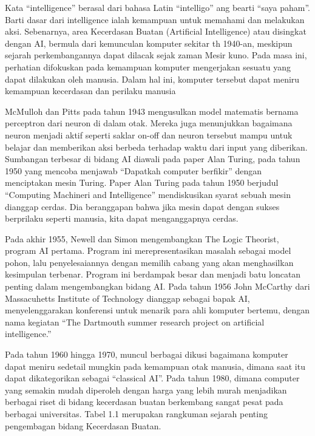 \hspace{1cm} Kata “intelligence” berasal dari bahasa Latin “intelligo” ang bearti “saya paham”.  Barti dasar dari intelligence ialah kemampuan untuk memahami dan melakukan aksi.  Sebenarnya, area Kecerdasan Buatan (Artificial Intelligence) atau disingkat dengan AI,  bermula dari kemunculan komputer sekitar th 1940-an, meskipun sejarah perkembangannya dapat dilacak sejak zaman Mesir kuno. Pada masa ini, perhatian difokuskan pada kemampuan komputer mengerjakan sesuatu yang dapat dilakukan oleh manusia.  Dalam hal ini, komputer tersebut dapat meniru kemampuan kecerdasan  dan perilaku  manusia

\hspace{1cm} McMulloh dan Pitts pada tahun 1943 mengusulkan model matematis bernama perceptron dari neuron di dalam  otak.  Mereka juga menunjukkan  bagaimana neuron menjadi aktif seperti saklar on-off dan neuron tersebut mampu untuk belajar dan memberikan aksi berbeda terhadap waktu dari input yang diberikan.  Sumbangan terbesar di bidang AI diawali pada paper Alan Turing, pada tahun 1950 yang mencoba menjawab  “Dapatkah computer berfikir” dengan menciptakan mesin Turing.  Paper Alan Turing pada tahun 1950 berjudul “Computing Machineri and Intelligence” mendiskusikan syarat sebuah mesin dianggap cerdas. Dia beranggapan bahwa jika mesin dapat dengan sukses berprilaku seperti manusia, kita dapat menganggapnya cerdas.

\hspace{1cm} Pada akhir 1955, Newell dan Simon mengembangkan  The Logic Theorist, program AI pertama. Program ini merepresentasikan  masalah sebagai model pohon, lalu penyelesaiannya dengan  memilih cabang yang akan menghasilkan kesimpulan terbenar. Program ini berdampak besar dan menjadi batu loncatan penting dalam mengembangkan bidang AI. Pada tahun 1956 John McCarthy dari  Massacuhetts Institute of Technology dianggap sebagai bapak AI, menyelenggarakan konferensi untuk menarik para ahli komputer bertemu, dengan  nama kegiatan “The Dartmouth summer research project on artificial intelligence.” 

\hspace{1cm} Pada  tahun 1960 hingga 1970, muncul berbagai dikusi bagaimana komputer dapat meniru sedetail mungkin pada kemampuan otak manusia, dimana saat itu dapat dikategorikan sebagai “classical AI”. Pada tahun 1980, dimana computer yang semakin mudah diperoleh dengan harga yang lebih murah menjadikan berbagai riset di bidang kecerdasan buatan berkembang sangat pesat pada berbagai universitas.  Tabel 1.1 merupakan rangkuman sejarah penting pengembagan bidang Kecerdasan Buatan.

